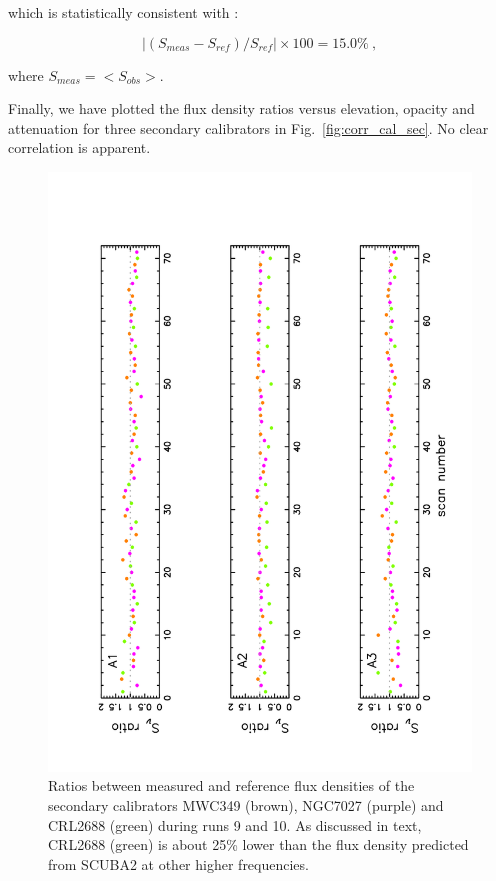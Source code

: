 \noindent which is statistically consistent with :

$$|(S_{meas}-S_{ref})/S_{ref}| \times 100=15.0\%~,$$

\noindent where $S_{meas} = <S_{obs}>$.

Finally, we have plotted the flux density ratios versus elevation, opacity and attenuation  for three
secondary calibrators in  Fig.~\ref{fig:corr_cal_sec}. No clear correlation is apparent.

\begin{figure}[p]
\begin{center}
  \includegraphics[clip, angle=-90, scale=0.6]{Figures/Ratio_vs_index_sec_r9_r10.pdf}
  \caption{Ratios between measured and reference flux densities of  the secondary calibrators  MWC349 (brown), NGC7027 (purple)  and CRL2688 (green)
  during runs 9 and 10. As discussed in text, CRL2688 (green) is about 25\% lower than the flux density predicted from SCUBA2 at other higher frequencies.
}
\end{center}
\end{figure}
